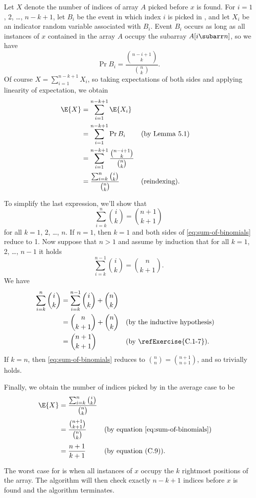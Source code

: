 Let $X$ denote the number of indices of array $A$ picked before $x$ is found.
For $i=1$, 2, \dots, $n-k+1$, let $B_i$ be the event in which index $i$ is picked in , and let $X_i$ be an indicator random variable associated with $B_i$.
Event $B_i$ occurs as long as all instances of $x$ contained in the array $A$ occupy the subarray $A[i\subarr n]$, so we have
\[
    \Pr{B_i} = \frac{\binom{n-i+1}{k}}{\binom{n}{k}}.
\]
Of course $X=\sum_{i=1}^{n-k+1}X_i$, so taking expectations of both sides and applying linearity of expectation, we obtain
\begin{align*}
    \E{X} &= \sum_{i=1}^{n-k+1}\E{X_i} \\
    &= \sum_{i=1}^{n-k+1}\Pr{B_i} && \text{(by Lemma 5.1)} \\
    &= \sum_{i=1}^{n-k+1}\frac{\binom{n-i+1}{k}}{\binom{n}{k}} \\
    &= \frac{\sum_{i=k}^n\binom{i}{k}}{\binom{n}{k}} && \text{(reindexing)}.
\end{align*}

To simplify the last expression, we'll show that
\begin{equation} \label{eq:sum-of-binomials}
    \sum_{i=k}^n\binom{i}{k} = \binom{n+1}{k+1}
\end{equation}
for all $k=1$, $2$, \dots, $n$.
If $n=1$, then $k=1$ and both sides of \eqref{eq:sum-of-binomials} reduce to 1.
Now suppose that $n>1$ and assume by induction that for all $k=1$, 2, \dots, $n-1$ it holds
\[
    \sum_{i=k}^{n-1}\binom{i}{k} = \binom{n}{k+1}.
\]
We have
\begin{align*}
    \sum_{i=k}^n\binom{i}{k} &= \sum_{i=k}^{n-1}\binom{i}{k}+\binom{n}{k} \\
    &= \binom{n}{k+1}+\binom{n}{k} && \text{(by the inductive hypothesis)} \\
    &= \binom{n+1}{k+1} && \text{(by \refExercise{C.1-7})}.
\end{align*}
If $k=n$, then \eqref{eq:sum-of-binomials} reduces to $\binom{n}{n}=\binom{n+1}{n+1}$, and so trivially holds.

Finally, we obtain the number of indices picked by  in the average case to be
\begin{align*}
    \E{X} &= \frac{\sum_{i=k}^n\binom{i}{k}}{\binom{n}{k}} \\[1mm]
    &= \frac{\binom{n+1}{k+1}}{\binom{n}{k}} && \text{(by equation \eqref{eq:sum-of-binomials})} \\[1mm]
    &= \frac{n+1}{k+1} && \text{(by equation (C.9))}.
\end{align*}

The worst case for  is when all instances of $x$ occupy the $k$ rightmost positions of the array.
The algorithm will then check exactly $n-k+1$ indices before $x$ is found and the algorithm terminates.
